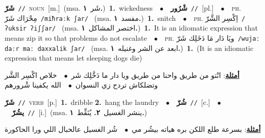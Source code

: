 \documentclass[10pt,a4paper,twoside]{article} %
\begin{document}
\begin{multicols}{2}
{\setlength\topsep{0pt}\textbf{\foreignlanguage{arabic}{شَرّ}}\ {\color{gray}\texttt{//}\color{black}}\ \textsc{noun}\ [m.]\ \color{gray}(msa. \foreignlanguage{arabic}{شَر}~\foreignlanguage{arabic}{\textbf{١.}})\color{black}\ \textbf{1.}~wickedness\ \ $\bullet$\ \ \setlength\topsep{0pt}\textbf{\foreignlanguage{arabic}{شْرُور}}\ {\color{gray}\texttt{//}\color{black}}\ [pl.]\ \ $\bullet$\ \ \textsc{ph.} \color{gray} \foreignlanguage{arabic}{مِحْرَاك شَرّ}\color{black}\ {\color{gray}\texttt{/{\sffamily miħraːk ʃar}/}\color{black}}\ \color{gray} (msa. \foreignlanguage{arabic}{مفسد}~\foreignlanguage{arabic}{\textbf{١.}})\color{black}\ \textbf{1.}~snitch\ \ $\bullet$\ \ \textsc{ph.} \color{gray} \foreignlanguage{arabic}{اِكْسِر الشَّرّ}\color{black}\ {\color{gray}\texttt{/{\sffamily ʔuksir ʔiʃʃar}/}\color{black}}\ \color{gray} (msa. \foreignlanguage{arabic}{اختصر المشاكل}~\foreignlanguage{arabic}{\textbf{١.}})\color{black}\ \textbf{1.}~It is an idiomatic expression that means zip it so that problems do not escalate\ \ $\bullet$\ \ \textsc{ph.} \color{gray} \foreignlanguage{arabic}{ويَا دَار مَا دَخَلِك شَرّ}\color{black}\ {\color{gray}\texttt{/{\sffamily wujaː daːr maː daxxalik ʃar}/}\color{black}}\ \color{gray} (msa. \foreignlanguage{arabic}{ابعد عن الشر وغنيله}~\foreignlanguage{arabic}{\textbf{١.}})\color{black}\ \textbf{1.}~(It is an idiomatic expression that means let sleeping dogs die)\  \begin{flushright}\color{gray}\foreignlanguage{arabic}{\textbf{\underline{\foreignlanguage{arabic}{أمثلة}}}: انْتو من طريق واحنا من طريق ويا دار ما دَخَّلِك شَر\ $\bullet$\ \  خلاص اكْسِر الشَّر وتضلكاش تردح زي النسوان\ $\bullet$\ \  الله يكفينا شْرورهم}\end{flushright}\color{black}} \vspace{2mm}

{\setlength\topsep{0pt}\textbf{\foreignlanguage{arabic}{شَرّ}}\ {\color{gray}\texttt{//}\color{black}}\ \textsc{verb}\ [p.]\ \textbf{1.}~dribble  \textbf{2.}~hang the laundry\ \ $\bullet$\ \ \setlength\topsep{0pt}\textbf{\foreignlanguage{arabic}{شُرّ}}\ {\color{gray}\texttt{//}\color{black}}\ [c.]\ \ $\bullet$\ \ \setlength\topsep{0pt}\textbf{\foreignlanguage{arabic}{يشُرّ}}\ {\color{gray}\texttt{//}\color{black}}\ [i.]\ \color{gray}(msa. \foreignlanguage{arabic}{ينشر الغسيل}~\foreignlanguage{arabic}{\textbf{٢.}}  \foreignlanguage{arabic}{يُنَقِّط}~\foreignlanguage{arabic}{\textbf{١.}})\color{black}\  \begin{flushright}\color{gray}\foreignlanguage{arabic}{\textbf{\underline{\foreignlanguage{arabic}{أمثلة}}}: بسرعة طلع اللكن بره هياته بيشُر مي\ $\bullet$\ \  شُر الغسيل عالحبال اللي ورا الحاكورة}\end{flushright}\color{black}} \vspace{2mm}


\end{multicols}
\end{document}
